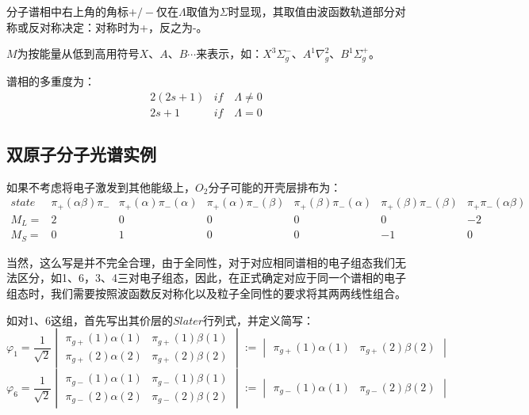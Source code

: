 分子谱相中右上角的角标$+/-$仅在$\Lambda$取值为$\Sigma$时显现，其取值由波函数轨道部分对称或反对称决定：对称时为+，反之为-。

$M$为按能量从低到高用符号$X$、$A$、$B$$\cdots$来表示，如：$X^3\Sigma^-_g$、$A^1\nabla^2_g$、$B^1\Sigma^+_g$。

谱相的多重度为：
\[
    \begin{array}{ll}
        2(2s+1) & if \quad \Lambda \neq 0 \\
        2s+1 & if \quad \Lambda = 0
    \end{array}
\]

\subsection{双原子分子光谱实例}
如果不考虑将电子激发到其他能级上，$O_2$分子可能的开壳层排布为：
\[
    \begin{array}{lcccccc}
        state & \pi_+(\alpha\beta)\pi_- & \pi_+(\alpha)\pi_-(\alpha) & \pi_+(\alpha)\pi_-(\beta) & \pi_+(\beta)\pi_-(\alpha) & \pi_+(\beta)\pi_-(\beta) & \pi_+\pi_-(\alpha\beta) \\
        M_L=  & 2 & 0 & 0 & 0 & 0 & -2 \\
        M_S=  & 0 & 1 & 0 & 0 & -1 & 0
    \end{array}
\]

当然，这么写是并不完全合理，由于全同性，对于对应相同谱相的电子组态我们无法区分，如1、6，3、4三对电子组态，因此，在正式确定对应于同一个谱相的电子组态时，我们需要按照波函数反对称化以及粒子全同性的要求将其两两线性组合。

如对1、6这组，首先写出其价层的$Slater$行列式，并定义简写：
\[
\varphi_1=\frac{1}{\sqrt{2}}
\begin{vmatrix}
    \pi_{g+}(1)\alpha(1) & \pi_{g+}(1)\beta(1) \\
    \pi_{g+}(2)\alpha(2) & \pi_{g+}(2)\beta(2)
\end{vmatrix}
:=
\begin{vmatrix}
    \pi_{g+}(1)\alpha(1) & \pi_{g+}(2)\beta(2)
\end{vmatrix}
\]
\[
\varphi_6=\frac{1}{\sqrt{2}}
\begin{vmatrix}
    \pi_{g-}(1)\alpha(1) & \pi_{g-}(1)\beta(1) \\
    \pi_{g-}(2)\alpha(2) & \pi_{g-}(2)\beta(2)
\end{vmatrix}
:=
\begin{vmatrix}
    \pi_{g-}(1)\alpha(1) & \pi_{g-}(2)\beta(2)
\end{vmatrix}
\]

